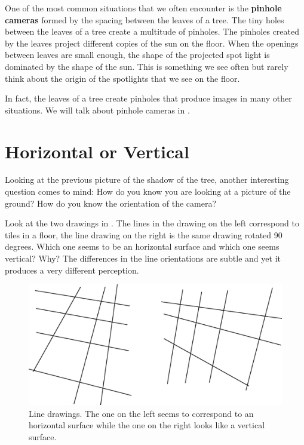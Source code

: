 One of the most common situations that we often encounter is the {\bf pinhole cameras} formed by the spacing between the leaves of a tree.
The tiny
holes between the leaves of a tree create a multitude of pinholes. The pinholes created by the leaves project different
copies of the sun on the floor. When the openings between leaves are small enough, the shape of the projected spot light is dominated by the shape of the sun.
This is something we see often but rarely think about the origin of the spotlights that we
see on the floor.




In fact, the leaves of a tree create pinholes that produce images in many other situations. We will talk about pinhole cameras in \chap{\ref{chapter:imaging}}.

\section{Horizontal or Vertical}

Looking at the previous picture of the shadow of the tree, another interesting question comes to mind: How do you know you are looking at a picture of the ground? How do you know the orientation of the camera?

Look at the two drawings in \fig{\ref{fig:vertical_or_horizontal}}. The lines in the drawing on the left correspond to tiles in a floor, the line drawing on the right is the same drawing rotated 90 degrees. Which one seems to be an horizontal surface and which one seems vertical? Why? The differences in the line orientations are subtle and yet it produces a very different perception.

\begin{figure}[t]
    \centerline{
        \includegraphics[width=1\linewidth]{figures/visionscience/vertical_or_horizontal.eps}}
    \caption{Line drawings. The one on the left seems to correspond to an horizontal surface while the one on the right looks like a vertical surface.}
    \label{fig:vertical_or_horizontal}
\end{figure}

